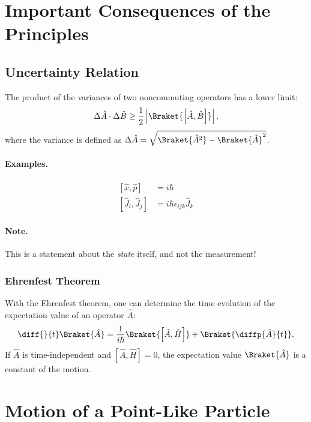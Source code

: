 \section{Important Consequences of the Principles}
\subsection{Uncertainty Relation}

The product of the variances of two noncommuting operators has a lower limit:
\begin{align}
    \Delta \hat{A} \cdot \Delta \hat{B} \geq \frac{1}{2} \left| \Braket{\left[\hat{A},\hat{B}\right]} \right|,
\end{align}
				where the variance is defined as $\Delta \hat{A} = \sqrt{\Braket{\hat{A}^2}-\Braket{\hat{A}}^2}$.

				\paragraph{Examples.}
					\begin{align}
						\left[ \hat{x}, \hat{p} \right] &= i \hbar \\
						\left[ \hat{J}_i , \hat{J}_j \right] &= i \hbar \epsilon_{ijk} \hat{J}_k
					\end{align}
				\paragraph{Note.} This is a statement about the \emph{state} itself, and not the measurement!

			\subsubsection{Ehrenfest Theorem}
				With the Ehrenfest theorem, one can determine the time evolution of the expectation value of an operator $\hat{A}$:
				\begin{align}
					\diff{}{t}\Braket{\hat{A}}=\frac{1}{i\hbar}\Braket{\left[\hat{A},\hat{H}\right]}+\Braket{\diffp{\hat{A}}{t}}. \label{eq:ehrenfest}
				\end{align}
				If $\hat{A}$ is time-independent and $\left[\hat{A},\hat{H}\right]=0$, the expectation value $\Braket{\hat{A}}$ is a constant of the motion.

	\section{Motion of a Point-Like Particle}
